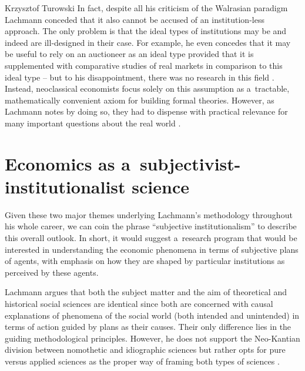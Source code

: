 \begin{artengenv}{Krzysztof Turowski}
In fact, despite all his criticism of the Walrasian paradigm Lachmann conceded that it also cannot be accused of an institution-less approach.
The only problem is that the ideal types of institutions may be and indeed are ill-designed in their case.
For example, he even concedes that it may be useful to rely on an auctioneer as an ideal type provided that it is supplemented with comparative studies of real markets in comparison to this ideal type -- but to his disappointment, there was no research in this field \parencite[40--41]{lachmann1986market}.
Instead, neoclassical economists focus solely on this assumption as a~tractable, mathematically convenient axiom for building formal theories. However, as Lachmann notes by doing so, they had to dispense with practical relevance for many important questions about the real world \parencite[142]{lachmann1986market}.

\section{Economics as a~subjectivist-institutionalist science}
\label{sec:inspirations}

Given these two major themes underlying Lachmann's methodology throughout his whole career, we can coin the phrase ``subjective institutionalism'' to describe this overall outlook.
In short, it would suggest a~research program that would be interested in understanding the economic phenomena in terms of subjective plans of agents, with emphasis on how they are shaped by particular institutions as perceived by these agents.

Lachmann argues that both the subject matter and the aim of theoretical and historical social sciences are identical since both are concerned with causal explanations of phenomena of the social world (both intended and unintended) in terms of action guided by plans as their causes.
Their only difference lies in the guiding methodological principles.
However, he does not support the Neo-Kantian division between nomothetic and idiographic sciences but rather opts for pure versus applied sciences as the proper way of framing both types of sciences \parencite[173--175]{lachmann-science}.


\end{artengenv}
